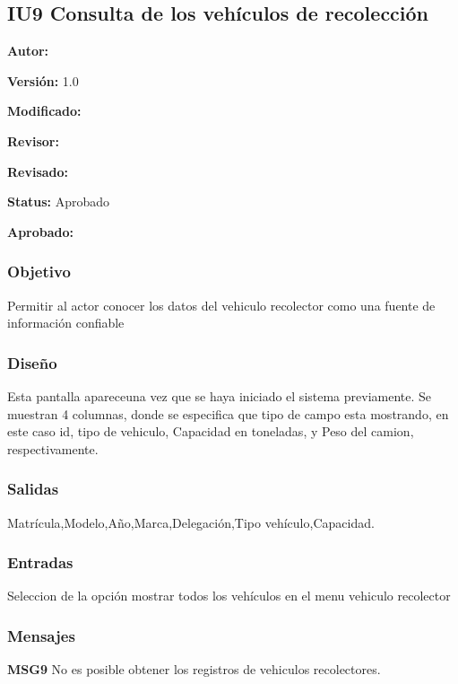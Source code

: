 \subsection{IU9 Consulta de los vehículos de recolección}

\begin{objetivos}
	\item {\bf Autor:} 
	\item {\bf Versión:} 1.0
	\item {\bf Modificado:} 
	\item {\bf Revisor:} 
	\item {\bf Revisado:}
	\item {\bf Status:} Aprobado
	\item {\bf Aprobado:} 
\end{objetivos}

\subsubsection{Objetivo}

	Permitir al actor conocer los datos del vehiculo recolector como una fuente de información confiable

\subsubsection{Diseño}
	Esta pantalla apareceuna vez que se haya iniciado el sistema previamente.
	Se muestran 4 columnas, donde se especifica que tipo de campo esta mostrando, en este caso id, tipo de vehiculo, Capacidad en toneladas, y Peso del camion, respectivamente.
	


\subsubsection{Salidas}

Matrícula,Modelo,Año,Marca,Delegación,Tipo vehículo,Capacidad.

\subsubsection{Entradas}
Seleccion de la opción mostrar todos los vehículos en el menu vehiculo recolector



\subsubsection{Mensajes}
	\begin{Citemize}
		\item {\bf MSG9} No es posible obtener los registros de vehiculos recolectores.
	\end{Citemize}